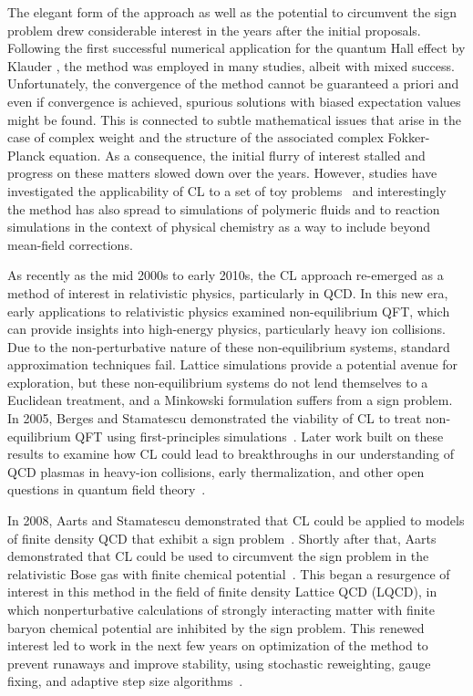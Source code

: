 \documentclass[../main.tex]{subfiles}
\begin{document}
The elegant form of the approach as well as the potential to circumvent the sign problem drew considerable interest in the years after the initial proposals. Following the first successful numerical application for the quantum Hall effect by Klauder \cite{Klauder1984}, the method was employed in many studies, albeit with mixed success. Unfortunately, the convergence of the method cannot be guaranteed a priori and even if convergence is achieved, spurious solutions with biased expectation values might be found. This is connected to subtle mathematical issues that arise in the case of complex weight and the structure of the associated complex Fokker-Planck equation. As a consequence, the initial flurry of interest stalled and progress on these matters slowed down over the years.
However, studies have investigated the applicability of CL to a set of toy problems~\cite{PRC2001026303} and interestingly the method has also spread to simulations of polymeric fluids \cite{Ganesan_2001,Fredrickson2002} and to reaction simulations in the context of physical chemistry \cite{HOCHBERG200654,DELOUBRIERE2002135} as a way to include beyond mean-field corrections.

As recently as the mid 2000s to early 2010s, the CL approach re-emerged as a method of interest in relativistic physics, particularly in QCD. In this new era, early applications to relativistic physics examined non-equilibrium QFT, which can provide insights into high-energy physics, particularly heavy ion collisions. Due to the non-perturbative nature of these non-equilibrium systems, standard approximation techniques fail. Lattice simulations provide a potential avenue for exploration, but these non-equilibrium systems do not lend themselves to a Euclidean treatment, and a Minkowski formulation suffers from a sign problem. In 2005, Berges and Stamatescu demonstrated the viability of CL to treat non-equilibrium QFT using first-principles simulations~\cite{PhysRevLett95202003}. Later work built on these results to examine how CL could lead to breakthroughs in our understanding of QCD plasmas in heavy-ion collisions, early thermalization, and other open questions in quantum field theory~\cite{PhysRevD75045007}.

In 2008, Aarts and Stamatescu demonstrated that CL could be applied to models of finite density QCD that exhibit a sign problem~\cite{JHEP200809018}. Shortly after that, Aarts demonstrated that CL could be used to circumvent the sign problem in the relativistic Bose gas with finite chemical potential~\cite{AartsPRL102131601, JHEP200905052}. This began a resurgence of interest in this method in the field of finite density Lattice QCD (LQCD), in which nonperturbative calculations of strongly interacting matter with finite baryon chemical potential are inhibited by the sign problem. This renewed interest led to work in the next few years on optimization of the method to prevent runaways and improve stability, using stochastic reweighting, gauge fixing, and adaptive step size algorithms~\cite{BERGES2008306,AARTS2010154,JHEP20100820}.
\end{document}

